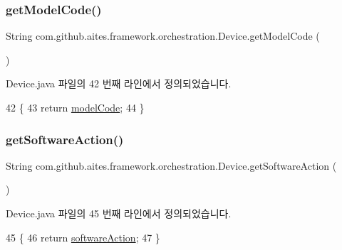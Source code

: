 \subsubsection{\texorpdfstring{get\+Model\+Code()}{getModelCode()}}
{\footnotesize\ttfamily String com.\+github.\+aites.\+framework.\+orchestration.\+Device.\+get\+Model\+Code (\begin{DoxyParamCaption}{ }\end{DoxyParamCaption})}



Device.\+java 파일의 42 번째 라인에서 정의되었습니다.


\begin{DoxyCode}
42                                 \{
43         \textcolor{keywordflow}{return} \mbox{\hyperlink{classcom_1_1github_1_1aites_1_1framework_1_1orchestration_1_1_device_ad40a301c336d5b74572d497eff8c90eb}{modelCode}};
44     \}
\end{DoxyCode}
\mbox{\label{classcom_1_1github_1_1aites_1_1framework_1_1orchestration_1_1_device_afcca102141c7dedc76bc2a02404c9b67}} 
\subsubsection{\texorpdfstring{get\+Software\+Action()}{getSoftwareAction()}}
{\footnotesize\ttfamily String com.\+github.\+aites.\+framework.\+orchestration.\+Device.\+get\+Software\+Action (\begin{DoxyParamCaption}{ }\end{DoxyParamCaption})}



Device.\+java 파일의 45 번째 라인에서 정의되었습니다.


\begin{DoxyCode}
45                                      \{
46         \textcolor{keywordflow}{return} \mbox{\hyperlink{classcom_1_1github_1_1aites_1_1framework_1_1orchestration_1_1_device_a0e90e3fc258c236228d8789722bdf3bb}{softwareAction}};
47     \}
\end{DoxyCode}
\mbox{\label{classcom_1_1github_1_1aites_1_1framework_1_1orchestration_1_1_device_ae78046d56adf2d173dae3a2e45164528}} 
